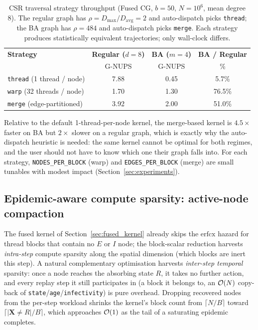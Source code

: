 \begin{table}[H]
\caption{CSR traversal strategy throughput (Fused CG, $b = 50$, $N = 10^6$, mean degree 8). The regular graph has $\rho = D_{\max}/D_{\mathrm{avg}} = 2$ and auto-dispatch picks \texttt{thread}; the BA graph has $\rho = 484$ and auto-dispatch picks \texttt{merge}. Each strategy produces statistically equivalent trajectories; only wall-clock differs.}
\label{tab:csr_dispatch}
\centering
\begin{tabular*}{\linewidth}{@{}lccc@{}}
\toprule
\textbf{Strategy} & \textbf{Regular ($d=8$)} & \textbf{BA ($m=4$)} & \textbf{BA / Regular} \\
 & G-NUPS & G-NUPS & \% \\
\midrule
\texttt{thread} (1 thread / node)        & 7.88 & 0.45 & 5.7\%  \\
\texttt{warp} (32 threads / node)        & 1.70 & 1.30 & 76.5\% \\
\texttt{merge} (edge-partitioned)        & 3.92 & 2.00 & 51.0\% \\
\bottomrule
\end{tabular*}
\end{table}

Relative to the default 1-thread-per-node kernel, the merge-based kernel is $4.5\times$ faster on BA but $2\times$ slower on a regular graph, which is exactly why the auto-dispatch heuristic is needed: the same kernel cannot be optimal for both regimes, and the user should not have to know which one their graph falls into. For each strategy, \texttt{NODES\_PER\_BLOCK} (warp) and \texttt{EDGES\_PER\_BLOCK} (merge) are small tunables with modest impact (Section~\ref{sec:experiments}).

\subsection{Epidemic-aware compute sparsity: active-node compaction}
\label{sec:compaction}

The fused kernel of Section~\ref{sec:fused_kernel} already skips the $\mathrm{erfcx}$ hazard for thread blocks that contain no $E$ or $I$ node; the block-scalar reduction harvests \emph{intra-step} compute sparsity along the spatial dimension (which blocks are inert this step). A natural complementary optimisation harvests \emph{inter-step temporal} sparsity: once a node reaches the absorbing state $R$, it takes no further action, and every replay step it still participates in (a block it belongs to, an $\mathcal{O}(N)$ copy-back of \texttt{state}/\texttt{age}/\texttt{infectivity}) is pure overhead. Dropping recovered nodes from the per-step workload shrinks the kernel's block count from $\lceil N/B \rceil$ toward $\lceil |\mathbf{X}{\ne}R| / B \rceil$, which approaches $\mathcal{O}(1)$ as the tail of a saturating epidemic completes.

